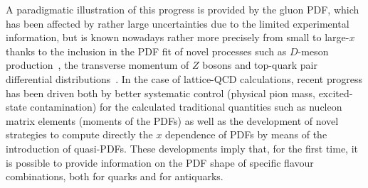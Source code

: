 A paradigmatic illustration of this progress is provided by the gluon PDF, which has been
affected by rather large uncertainties due to the limited experimental
information, but is known nowadays rather more precisely from small to large-$x$
thanks to the inclusion in the
PDF fit of novel processes such as $D$-meson production~\cite{Gauld:2016kpd},
the transverse momentum of $Z$ bosons and top-quark pair differential
distributions~\cite{Czakon:2016olj}.
%
In the case of lattice-QCD calculations, recent progress has been driven both
by better systematic control (physical pion mass, excited-state contamination) for the calculated traditional quantities such as nucleon
matrix elements (moments of the PDFs) as well as the development of novel
strategies to compute directly the $x$ dependence of PDFs by means of the
introduction of quasi-PDFs.
%
These developments imply that, for the first time, it is possible to provide information on the PDF shape
of specific flavour combinations, both for quarks and for antiquarks.

